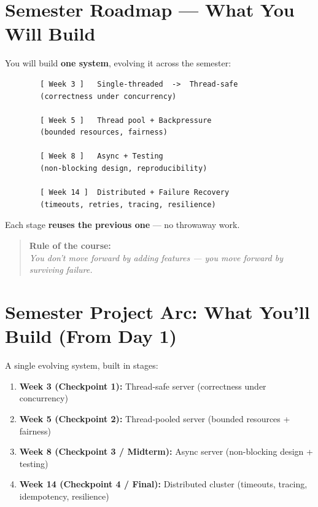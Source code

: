 \documentclass[11pt,a4paper]{article}
\begin{document}
	\section*{Semester Roadmap --- What You Will Build}
	
	You will build \textbf{one system}, evolving it across the semester:
	
	\begin{verbatim}
		[ Week 3 ]   Single-threaded  ->  Thread-safe
		(correctness under concurrency)
		
		[ Week 5 ]   Thread pool + Backpressure
		(bounded resources, fairness)
		
		[ Week 8 ]   Async + Testing
		(non-blocking design, reproducibility)
		
		[ Week 14 ]  Distributed + Failure Recovery
		(timeouts, retries, tracing, resilience)
	\end{verbatim}
	
	Each stage \textbf{reuses the previous one} --- no throwaway work.
	
	\begin{quote}
		\textbf{Rule of the course:}\\
		\textit{You don't move forward by adding features --- you move forward by surviving failure.}
	\end{quote}
	
	\section*{Semester Project Arc: What You'll Build (From Day 1)}
	
	A single evolving system, built in stages:
	
	\begin{enumerate}[leftmargin=*]
		\item \textbf{Week 3 (Checkpoint 1):} Thread-safe server (correctness under concurrency)
		\item \textbf{Week 5 (Checkpoint 2):} Thread-pooled server (bounded resources + fairness)
		\item \textbf{Week 8 (Checkpoint 3 / Midterm):} Async server (non-blocking design + testing)
		\item \textbf{Week 14 (Checkpoint 4 / Final):} Distributed cluster (timeouts, tracing, idempotency, resilience)
	\end{enumerate}
	
\end{document}
